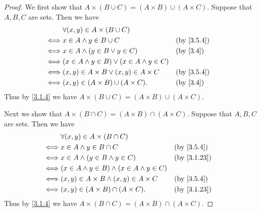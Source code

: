 \begin{proof}
  We first show that \(A \times (B \cup C) = (A \times B) \cup (A \times C)\).
  Suppose that \(A, B, C\) are sets.
  Then we have
  \begin{align*}
         & \forall (x, y) \in A \times (B \cup C)                                             \\
    \iff & x \in A \land y \in B \cup C                         &  & \text{(by \cref{3.5.4})} \\
    \iff & x \in A \land (y \in B \lor y \in C)                 &  & \text{(by \cref{3.4})}   \\
    \iff & (x \in A \land y \in B) \lor (x \in A \land y \in C)                               \\
    \iff & (x, y) \in A \times B \lor (x, y) \in A \times C     &  & \text{(by \cref{3.5.4})} \\
    \iff & (x, y) \in (A \times B) \cup (A \times C).           &  & \text{(by \cref{3.4})}
  \end{align*}
  Thus by \cref{3.1.4} we have \(A \times (B \cup C) = (A \times B) \cup (A \times C)\).

  Next we show that \(A \times (B \cap C) = (A \times B) \cap (A \times C)\).
  Suppose that \(A, B, C\) are sets.
  Then we have
  \begin{align*}
         & \forall (x, y) \in A \times (B \cap C)                                               \\
    \iff & x \in A \land y \in B \cap C                          &  & \text{(by \cref{3.5.4})}  \\
    \iff & x \in A \land (y \in B \land y \in C)                 &  & \text{(by \cref{3.1.23})} \\
    \iff & (x \in A \land y \in B) \land (x \in A \land y \in C)                                \\
    \iff & (x, y) \in A \times B \land (x, y) \in A \times C     &  & \text{(by \cref{3.5.4})}  \\
    \iff & (x, y) \in (A \times B) \cap (A \times C).            &  & \text{(by \cref{3.1.23})}
  \end{align*}
  Thus by \cref{3.1.4} we have \(A \times (B \cap C) = (A \times B) \cap (A \times C)\).


\end{proof}
